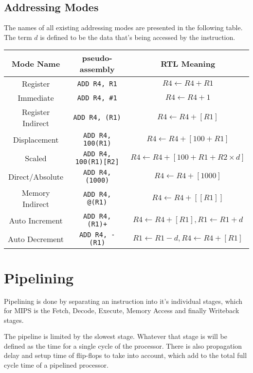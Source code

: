 \documentclass{article}
\theoremstyle{remark}
\begin{document}
\subsection{Addressing Modes}
The names of all existing addressing modes are presented in the following table. The term \(d\) is defined to be the data that's being accessed by the instruction.
\begin{table}[!htbp]
    \centering
    \begin{tabular}{ c c c }
        \toprule
        Mode Name         & pseudo-assembly         & RTL Meaning                                        \\
        \midrule
        Register          & \verb"ADD R4, R1" & \(R4 \leftarrow R4 + R1\)                          \\
        Immediate         & \verb"ADD R4, #1" & \(R4 \leftarrow R4 + 1\)                           \\
        Register Indirect & \verb"ADD R4, (R1)" & \(R4 \leftarrow R4 + [R1]\)                        \\
        Displacement      & \verb"ADD R4, 100(R1)" & \(R4 \leftarrow R4 + [100 + R1]\)                  \\
        Scaled            & \verb"ADD R4, 100(R1)[R2]" & \(R4 \leftarrow R4 + [100 + R1 + R2 \times d]\)    \\
        Direct/Absolute   & \verb"ADD R4, (1000)" & \(R4 \leftarrow R4 + [1000]\)                      \\
        Memory Indirect   & \verb"ADD R4, @(R1)" & \(R4 \leftarrow R4 +[[R1]]\)                       \\
        Auto Increment    & \verb"ADD R4, (R1)+" & \(R4 \leftarrow R4 + [R1], R1 \leftarrow R1 + d \) \\
        Auto Decrement    & \verb"ADD R4, -(R1)" & \(R1 \leftarrow R1 - d, R4 \leftarrow R4 + [R1]\)  \\
        \bottomrule
    \end{tabular}
\end{table}

\section{Pipelining}

Pipelining is done by separating an instruction into it's individual stages, which for MIPS is the Fetch, Decode, Execute, Memory Access and finally Writeback stages.

The pipeline is limited by the slowest stage. Whatever that stage is will be defined as the time for a single cycle of the processor. There is also propagation delay and setup time of flip-flops to take into account, which add to the total full cycle time of a pipelined processor.
\end{document}
